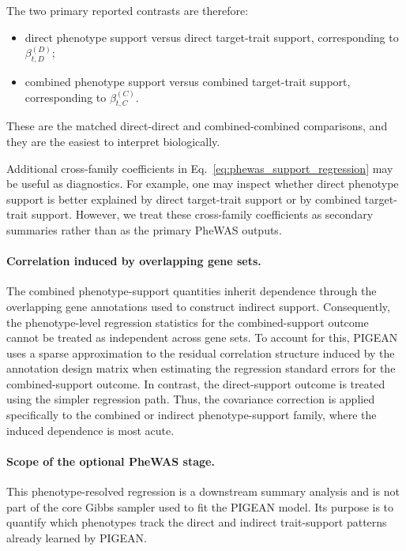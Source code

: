 \documentclass[11pt]{article}
\begin{document}
The two primary reported contrasts are therefore:
\begin{itemize}
\item direct phenotype support versus direct target-trait support, corresponding to $\beta_{t,D}^{(D)}$;
\item combined phenotype support versus combined target-trait support, corresponding to $\beta_{t,C}^{(C)}$.
\end{itemize}
These are the matched direct-direct and combined-combined comparisons, and they are the easiest to interpret biologically.

Additional cross-family coefficients in Eq.~\eqref{eq:phewas_support_regression} may be useful as diagnostics. For example, one may inspect whether direct phenotype support is better explained by direct target-trait support or by combined target-trait support. However, we treat these cross-family coefficients as secondary summaries rather than as the primary PheWAS outputs.

\paragraph{Correlation induced by overlapping gene sets.}
The combined phenotype-support quantities inherit dependence through the overlapping gene annotations used to construct indirect support. Consequently, the phenotype-level regression statistics for the combined-support outcome cannot be treated as independent across gene sets. To account for this, PIGEAN uses a sparse approximation to the residual correlation structure induced by the annotation design matrix when estimating the regression standard errors for the combined-support outcome. In contrast, the direct-support outcome is treated using the simpler regression path. Thus, the covariance correction is applied specifically to the combined or indirect phenotype-support family, where the induced dependence is most acute.

\paragraph{Scope of the optional PheWAS stage.}
This phenotype-resolved regression is a downstream summary analysis and is not part of the core Gibbs sampler used to fit the PIGEAN model. Its purpose is to quantify which phenotypes track the direct and indirect trait-support patterns already learned by PIGEAN.
\end{document}
